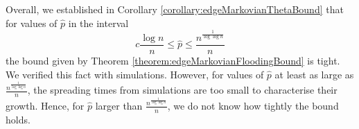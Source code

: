 

Overall, we established in Corollary \ref{corollary:edgeMarkovianThetaBound} that for values of $\hat{p}$ in the interval 
$$
	c \frac{\log n}{n} \leq \hat{p} \leq  \frac{n^\frac{1}{\log \log n}}{n}
$$
the bound given by Theorem \ref{theorem:edgeMarkovianFloodingBound} is tight. We verified this fact with simulations. However, for values of $\hat{p}$ at least as large as $\frac{n^\frac{1}{\log \log n}}{n}$, the spreading times from simulations are too small to characterise their growth. Hence, for $\hat{p}$ larger than $\frac{n^\frac{1}{\log \log n}}{n}$, we do not know how tightly the bound holds.